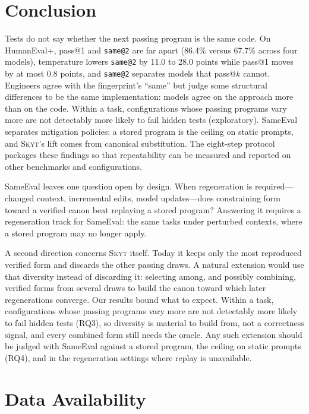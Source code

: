 \documentclass[acmsmall,screen,review,anonymous]{acmart}
\makeatletter
\newcommand{\skyt}{\textsc{Skyt}}
\newcommand{\sameeval}{SameEval}
\newcommand{\sameat}{\mbox{\texttt{same@2}}}
\makeatother
\begin{document}
\section{Conclusion}
\label{sec:conclusion}

Tests do not say whether the next passing program is the same code.
On HumanEval+, pass@1 and \sameat{} are far apart (86.4\% versus 67.7\%
across four models), temperature lowers \sameat{} by 11.0 to 28.0 points
while pass@1 moves by at most 0.8 points, and \sameat{} separates models that
pass@$k$ cannot.
Engineers agree with the fingerprint's ``same'' but judge some structural
differences to be the same implementation: models agree on the approach more
than on the code.
Within a task, configurations whose passing programs vary more are not
detectably more likely to fail hidden tests (exploratory).
\sameeval{} separates mitigation policies: a stored program is the ceiling on
static prompts, and \skyt{}'s lift comes from canonical substitution.
The eight-step protocol packages these findings so that repeatability can be
measured and reported on other benchmarks and configurations.

\sameeval{} leaves one question open by design.
When regeneration is required---changed context, incremental edits, model
updates---does constraining form toward a verified canon beat replaying a
stored program?
Answering it requires a regeneration track for \sameeval{}: the same tasks
under perturbed contexts, where a stored program may no longer apply.

A second direction concerns \skyt{} itself.
Today it keeps only the most reproduced verified form and discards the other
passing draws.
A natural extension would use that diversity instead of discarding it:
selecting among, and possibly combining, verified forms from several draws to
build the canon toward which later regenerations converge.
Our results bound what to expect.
Within a task, configurations whose passing programs vary more are not
detectably more likely to fail hidden tests (RQ3), so diversity is material to
build from, not a correctness signal, and every combined form still needs the
oracle.
Any such extension should be judged with \sameeval{} against a stored program,
the ceiling on static prompts (RQ4), and in the regeneration settings where
replay is unavailable.

\section*{Data Availability}
\label{sec:data}
\end{document}
